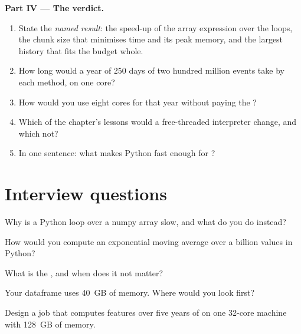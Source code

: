 \begin{problem}
\medskip\noindent\textbf{Part IV --- The verdict.}
\begin{enumerate}[resume]
\item State the \emph{named result}: the speed-up of the array expression over the loops, the chunk size that minimises time and its
peak memory, and the largest history that fits the budget whole.
\item How long would a year of 250 days of two hundred million events take by each method, on one core?
\item How would you use eight cores for that year without paying the ?
\item Which of the chapter's lessons would a free-threaded interpreter change, and which not?
\item In one sentence: what makes Python fast enough for ?
\end{enumerate}
\end{problem}

\section{Interview questions}

\begin{interviewq}\label{iq:pl:python-at-scale:1}
Why is a Python loop over a numpy array slow, and what do you do instead?
\end{interviewq}

\begin{interviewq}\label{iq:pl:python-at-scale:2}
How would you compute an exponential moving average over a billion values in Python?
\end{interviewq}

\begin{interviewq}\label{iq:pl:python-at-scale:3}
What is the , and when does it not matter?
\end{interviewq}

\begin{interviewq}\label{iq:pl:python-at-scale:4}
Your dataframe uses 40~GB of memory. Where would you look first?
\end{interviewq}

\begin{interviewq}\label{iq:pl:python-at-scale:5}
Design a job that computes features over five years of  on one 32-core machine with 128~GB of memory.
\end{interviewq}
